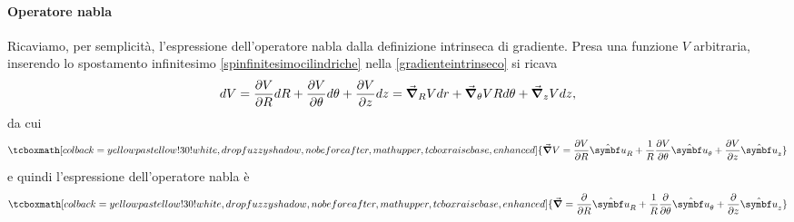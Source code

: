 \paragraph{Operatore nabla}
Ricaviamo, per semplicità, l'espressione dell'operatore nabla dalla definizione intrinseca di gradiente. Presa una funzione $V$ arbitraria, inserendo lo spostamento infinitesimo \ref{spinfinitesimocilindriche} nella \ref{gradienteintrinseco} si ricava
\begin{equation*}
	dV=\pdv{V}{R}dR+\pdv{V}{\theta}d\theta+\pdv{V}{z}dz=\grad_R{V}dr+\grad_\theta{V}Rd\theta+\grad_z{V}dz,
\end{equation*}
da cui
\begin{equation}
	\tcboxmath[colback=yellowpastellow!30!white,drop fuzzy shadow, nobeforeafter, math upper, tcbox raise base, enhanced]{\grad{V}=\pdv{V}{R}\vbh{u}_R+\frac{1}{R}\pdv{V}{\theta}\vbh{u}_\theta+\pdv{V}{z}\vbh{u}_z}
\end{equation}
e quindi l'espressione dell'operatore nabla è
\begin{equation}
	\tcboxmath[colback=yellowpastellow!30!white,drop fuzzy shadow, nobeforeafter, math upper, tcbox raise base, enhanced]{\grad =\pdv{R}\vbh{u}_R+\frac{1}{R}\pdv{\theta}\vbh{u}_\theta+\pdv{z}\vbh{u}_z}
\end{equation}
